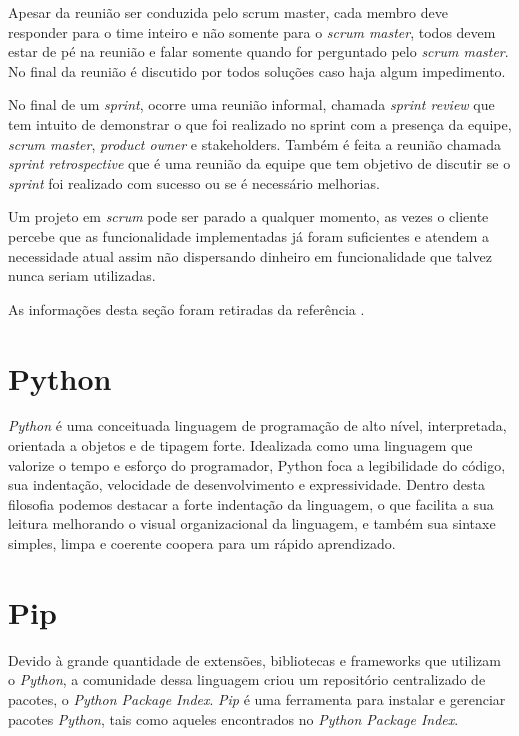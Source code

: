 \documentclass{abnt}
\begin{document}
			Apesar da reunião ser conduzida pelo scrum master, cada membro deve responder para o time inteiro e não somente para o
			\emph{scrum master}, todos devem estar de pé na reunião e falar somente quando for perguntado pelo \emph{scrum master}. No final da
			reunião é discutido por todos soluções caso haja algum impedimento.
			
			No final de um \emph{sprint}, ocorre uma reunião informal, chamada \emph{sprint review} que tem intuito de demonstrar o que foi 
			realizado no sprint com a presença da equipe, \emph{scrum master}, \emph{product owner} e stakeholders. Também é feita a reunião chamada \emph{sprint retrospective}
			que é uma reunião da equipe que tem objetivo de discutir se o \emph{sprint} foi realizado com sucesso ou se é necessário melhorias.
			
			Um projeto em \emph{scrum} pode ser parado a qualquer momento, as vezes o cliente percebe que as funcionalidade implementadas já foram
			suficientes e atendem a necessidade atual assim não dispersando dinheiro em funcionalidade que talvez nunca seriam utilizadas.
			
			As informações desta seção foram retiradas da referência \cite{SCRUMEPF}.
	
	\section{Python}
	
		\emph{Python} é uma conceituada linguagem de programação de alto nível, interpretada, orientada a objetos e de tipagem forte. Idealizada como uma linguagem que valorize o tempo e esforço do programador, Python foca a legibilidade do código, sua indentação, velocidade de desenvolvimento e expressividade. Dentro desta filosofia 
		podemos destacar a forte indentação da linguagem, o que facilita a sua leitura melhorando o visual organizacional da linguagem, e também sua sintaxe simples, limpa e coerente coopera para um rápido aprendizado.\cite{PYTHON}
	
	\section{Pip}
	
		Devido à grande quantidade de extensões, bibliotecas e frameworks que utilizam o \emph{Python}, a comunidade dessa linguagem criou um repositório centralizado de pacotes, o \emph{Python Package Index}.
		\emph{Pip} é uma ferramenta para instalar e gerenciar pacotes \emph{Python}, tais como aqueles encontrados no \emph{Python Package Index}.\cite{PIPSITE}
\end{document}
